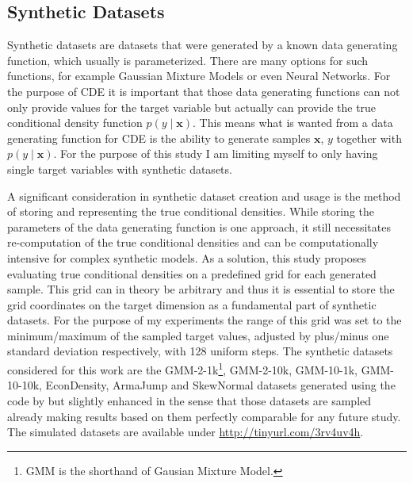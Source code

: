 \documentclass{article}
\begin{document}
\subsection{Synthetic Datasets}\label{sec:synthetic_datasets}

Synthetic datasets are datasets that were generated by a known data generating function, which usually is parameterized. There are many options for such functions, for example Gaussian Mixture Models or even Neural Networks. For the purpose of CDE it is important that those data generating functions can not only provide values for the target variable but actually can provide the true conditional density function $p(y\mid \mathbf{x})$. This means what is wanted from a data generating function for CDE is the ability to generate samples $\mathbf{x}$, $y$ together with $p(y\mid \mathbf{x})$. For the purpose of this study I am limiting myself to only having single target variables with synthetic datasets.

A significant consideration in synthetic dataset creation and usage is the method of storing and representing the true conditional densities. While storing the parameters of the data generating function is one approach, it still necessitates re-computation of the true conditional densities and can be computationally intensive for complex synthetic models. As a solution, this study proposes evaluating true conditional densities on a predefined grid for each generated sample. This grid can in theory be arbitrary and thus it is essential to store the grid coordinates on the target dimension as a fundamental part of synthetic datasets. For the purpose of my experiments the range of this grid was set to the minimum/maximum of the sampled target values, adjusted by plus/minus one standard deviation respectively, with 128 uniform steps. The synthetic datasets considered for this work are the GMM-2-1k\footnote{GMM is the shorthand of Gausian Mixture Model.}, GMM-2-10k, GMM-10-1k, GMM-10-10k, EconDensity, ArmaJump and SkewNormal datasets generated using the code by \citep{rothfuss2019conditional} but slightly enhanced in the sense that those datasets are sampled already making results based on them perfectly comparable for any future study. The simulated datasets are available under \url{http://tinyurl.com/3rv4uv4h}.
\end{document}

